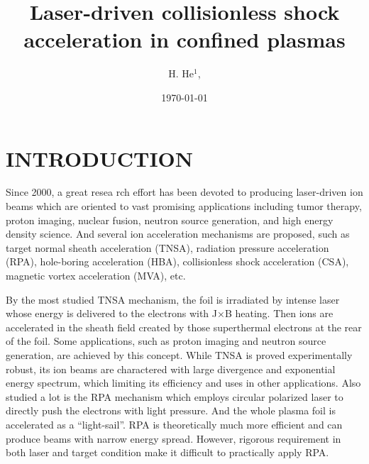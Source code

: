 \documentclass[12pt]{iopart}
\begin{document}
\title[]{Laser-driven collisionless shock acceleration in confined plasmas}

\author{H. He$^1$, }
\address{$^1$ Center for Applied Physics and Technology, HEDPS, State Key Laboratory of Nuclear Physics and Technology, and School of Physics, Peking University, Beijing, 100871, China}

\date{\today}

\begin{abstract}


\end{abstract}

\pacs{}

\maketitle
\section{INTRODUCTION}
\label{Introduction}
Since 2000, a great resea rch effort has been devoted to producing laser-driven ion beams\cite{daido_review_2012,macchi_ion_2013} which are oriented to vast promising applications including tumor therapy, proton imaging, nuclear fusion, neutron source generation, and high energy density science. And several ion acceleration mechanisms are proposed, such as target normal sheath acceleration (TNSA), radiation pressure acceleration (RPA), hole-boring acceleration (HBA), collisionless shock acceleration (CSA), magnetic vortex acceleration (MVA), etc. 

By the most studied TNSA mechanism, the foil is irradiated by intense laser whose energy is delivered to the electrons with J×B heating. Then ions are accelerated in the sheath field created by those superthermal electrons at the rear of the foil. Some applications, such as proton imaging and neutron source generation, are achieved by this concept. While TNSA is proved experimentally robust, its ion beams are charactered with large divergence and exponential energy spectrum, which limiting its efficiency and uses in other applications. Also studied a lot is the RPA mechanism which employs circular polarized laser to directly push the electrons with light pressure. And the whole plasma foil is accelerated as a “light-sail”. RPA is theoretically much more efficient and can produce beams with narrow energy spread. However, rigorous requirement in both laser and target condition make it difficult to practically apply RPA.
\end{document}
